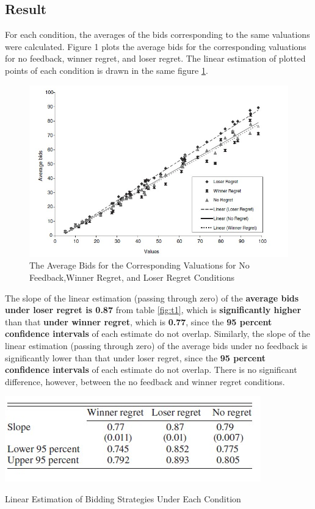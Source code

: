 \documentclass[10pt,a4paper,oneside]{report}
\begin{document}
\subsection{Result}
For each condition, the averages of the bids corresponding to the same valuations were calculated. Figure 1 plots the average bids for the corresponding valuations for no feedback, winner regret, and loser regret. The linear estimation of plotted points of each condition is drawn in the same figure  \ref{fig:x graph}.\citep{filizy2005auctions}
\begin{figure}[H]
\centering
\includegraphics[scale=0.64]{t2.jpg}
\caption{The Average Bids for the Corresponding Valuations for No Feedback,Winner Regret, and Loser Regret Conditions \citep{filizy2005auctions}}
\label{fig:x graph}
\end{figure}



\noindent The slope of the linear estimation (passing through zero) of the \textbf{average bids under loser regret is 0.87} from table \ref{fig:t1}, which is \textbf{significantly higher} than that \textbf{under winner regret}, which is \textbf{0.77}, since the \textbf{95 percent confidence intervals} of each estimate do not overlap. Similarly, the slope of the linear estimation (passing through zero) of the average bids under no feedback is significantly lower than that under loser regret, since the \textbf{95 percent confidence intervals} of each estimate do not overlap. There is no significant difference, however, between the no feedback and winner regret conditions\citep{filizy2005auctions}.\\[0.6mm]

\begin{table}[H]
\centering
\includegraphics[scale=0.9]{t1.jpg}
\caption{Linear Estimation of Bidding Strategies Under Each Condition \citep{filizy2005auctions}}
\label{fig:t1}
\end{table}
\end{document}
